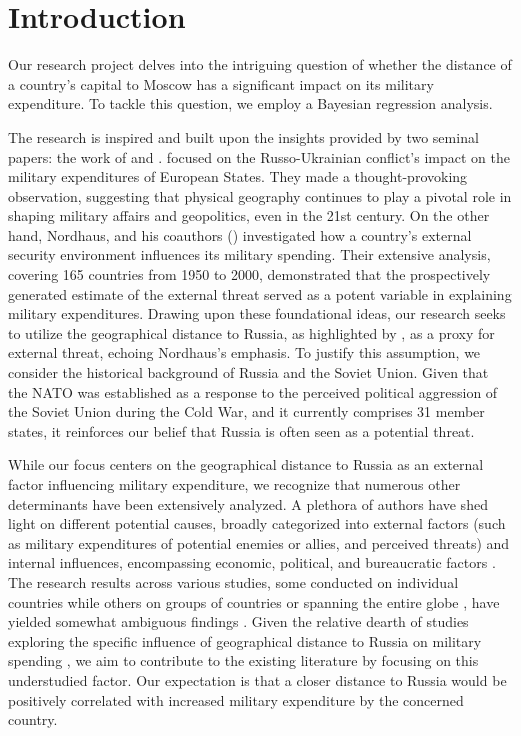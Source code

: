 \documentclass[12pt,a4paper]{article}
\begin{document}
\section{Introduction}
Our research project delves into the intriguing question of whether the distance of a country's capital to Moscow has a significant impact on its military expenditure. To tackle this question, we employ a Bayesian regression analysis.

The research is inspired and built upon the insights provided by two seminal papers: the work of \citet{kofrovn2023} and \citet{nordhaus2012}. \citet{kofrovn2023} focused on the Russo-Ukrainian conflict's impact on the military expenditures of European States. They made a thought-provoking observation, suggesting that physical geography continues to play a pivotal role in shaping military affairs and geopolitics, even in the 21st century. On the other hand, Nordhaus, and his coauthors (\citeyear{nordhaus2012}) investigated how a country's external security environment influences its military spending. Their extensive analysis, covering 165 countries from 1950 to 2000, demonstrated that the prospectively generated estimate of the external threat served as a potent variable in explaining military expenditures. Drawing upon these foundational ideas, our research seeks to utilize the geographical distance to Russia, as highlighted by \citet{kofrovn2023}, as a proxy for external threat, echoing Nordhaus's emphasis. To justify this assumption, we consider the historical background of Russia and the Soviet Union. Given that the NATO was established as a response to the perceived political aggression of the Soviet Union during the Cold War, and it currently comprises 31 member states, it reinforces our belief that Russia is often seen as a potential threat.

While our focus centers on the geographical distance to Russia as an external factor influencing military expenditure, we recognize that numerous other determinants have been extensively analyzed. A plethora of authors have shed light on different potential causes, broadly categorized into external factors (such as military expenditures of potential enemies or allies, and perceived threats) and internal influences, encompassing economic, political, and bureaucratic factors \citep{nikolaidou2008}. The research results across various studies, some conducted on individual countries while others on groups of countries or spanning the entire globe \citep{nikolaidou2008,george2018,nordhaus2012}, have yielded somewhat ambiguous findings \citep{nikolaidou2008,odehnal2020}. 
Given the relative dearth of studies exploring the specific influence of geographical distance to Russia on military spending \citep{kofrovn2023}, we aim to contribute to the existing literature by focusing on this understudied factor. Our expectation is that a closer distance to Russia would be positively correlated with increased military expenditure by the concerned country.  
\end{document}
